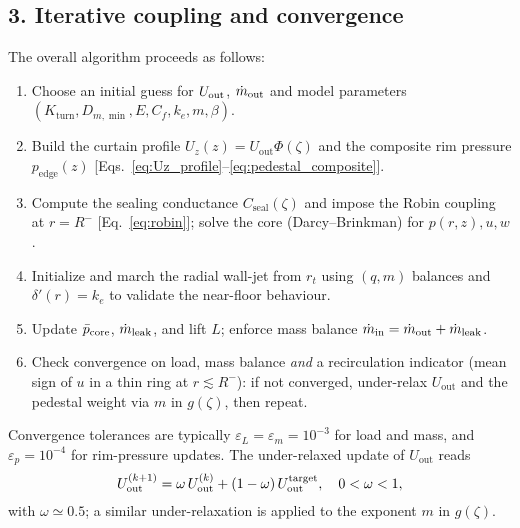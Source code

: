 \documentclass[11pt,a4paper]{article}
\begin{document}
\subsection*{3. Iterative coupling and convergence}
The overall algorithm proceeds as follows:
\begin{enumerate}
  \item Choose an initial guess for \(U_{\rm out}\), \(\dot m_{\rm out}\) and model parameters \((K_{\mathrm{turn}},D_{m,\min},E,C_f,k_e,m,\beta)\).
  \item Build the curtain profile \(U_z(z)=U_{\mathrm{out}}\Phi(\zeta)\) and the composite rim pressure \(p_{\mathrm{edge}}(z)\) [Eqs.~\eqref{eq:Uz_profile}--\eqref{eq:pedestal_composite}].
  \item Compute the sealing conductance \(C_{\mathrm{seal}}(\zeta)\) and impose the Robin coupling at \(r=R^{-}\) [Eq.~\eqref{eq:robin}]; solve the core (Darcy--Brinkman) for \(p(r,z),u,w\).
  \item Initialize and march the radial wall-jet from \(r_t\) using \((q,m)\) balances and \(\delta'(r)=k_e\) to validate the near-floor behaviour.
  \item Update \(\bar p_{\rm core}\), \(\dot m_{\rm leak}\), and lift \(L\); enforce mass balance \(\dot m_{\rm in}=\dot m_{\rm out}+\dot m_{\rm leak}\).
  \item Check convergence on load, mass balance \emph{and} a recirculation indicator (mean sign of \(u\) in a thin ring at \(r\lesssim R^{-}\)): if not converged, under-relax \(U_{\mathrm{out}}\) and the pedestal weight via \(m\) in \(g(\zeta)\), then repeat.
\end{enumerate}
Convergence tolerances are typically \(\varepsilon_L=\varepsilon_m=10^{-3}\) for load and mass, and \(\varepsilon_p=10^{-4}\) for rim-pressure updates.
The under-relaxed update of \(U_{\mathrm{out}}\) reads
\[
  U_{\mathrm{out}}^{(k+1)} = \omega\,U_{\mathrm{out}}^{(k)} + (1-\omega)\,U_{\mathrm{out}}^{\rm target}, 
  \quad 0<\omega<1,
\]
with \(\omega\simeq 0.5\); a similar under-relaxation is applied to the exponent \(m\) in \(g(\zeta)\).
\end{document}

